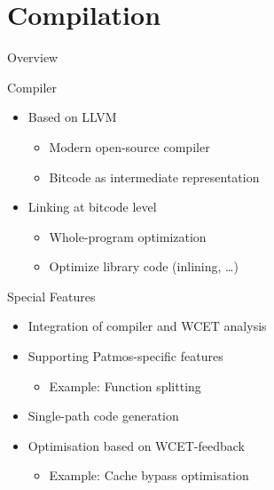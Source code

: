 \documentclass[17pt]{beamer}
\begin{document}
\section{Compilation}

\begin{frame}{Overview}
  \tableofcontents[currentsection]
\end{frame}

\begin{frame}{Compiler}
  \begin{itemize}
  \item Based on LLVM
    \begin{itemize}
    \item Modern open-source compiler
    \item Bitcode as intermediate representation
    \end{itemize}
  \item Linking at bitcode level
    \begin{itemize}
    \item Whole-program optimization
    \item Optimize library code (inlining, \dots)
    \end{itemize}
  \end{itemize}
\end{frame}

\begin{frame}{Special Features}
  \begin{itemize}
  \item Integration of compiler and WCET analysis
  \item Supporting Patmos-specific features
    \begin{itemize}
    \item Example: Function splitting
    \end{itemize}
  \item Single-path code generation
  \item Optimisation based on WCET-feedback
    \begin{itemize}
    \item Example: Cache bypass optimisation
    \end{itemize}
  \end{itemize}
\end{frame}
\end{document}
